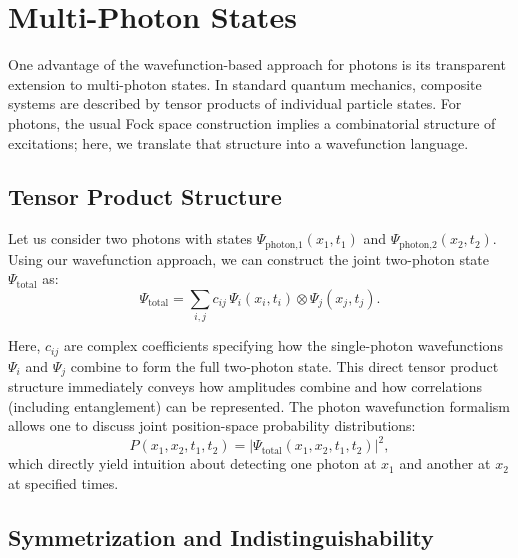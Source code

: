 \documentclass[aps,prl,twocolumn,showpacs,showkeys,superscriptaddress,amsmath,amssymb]{revtex4-2}
\begin{document}

\section{Multi-Photon States}
\label{sec:multipartite}

One advantage of the wavefunction-based approach for photons is its transparent extension to multi-photon states. In standard quantum mechanics, composite systems are described by tensor products of individual particle states. For photons, the usual Fock space construction implies a combinatorial structure of excitations; here, we translate that structure into a wavefunction language.


\subsection{Tensor Product Structure}

Let us consider two photons with states $\Psi_{\text{photon,1}}(x_1,t_1)$ and $\Psi_{\text{photon,2}}(x_2,t_2)$. Using our wavefunction approach, we can construct the joint two-photon state $\Psi_{\text{total}}$ as:
\begin{equation}
\Psi_{\text{total}} = \sum_{i,j} c_{ij}\,\Psi_i(x_i,t_i)\otimes \Psi_j(x_j,t_j).
\end{equation}

Here, $c_{ij}$ are complex coefficients specifying how the single-photon wavefunctions $\Psi_i$ and $\Psi_j$ combine to form the full two-photon state. This direct tensor product structure immediately conveys how amplitudes combine and how correlations (including entanglement) can be represented. The photon wavefunction formalism allows one to discuss joint position-space probability distributions:
\begin{equation}
P(x_1,x_2,t_1,t_2) = |\Psi_{\text{total}}(x_1,x_2,t_1,t_2)|^2,
\end{equation}
which directly yield intuition about detecting one photon at $x_1$ and another at $x_2$ at specified times.

\subsection{Symmetrization and Indistinguishability}
\end{document}
